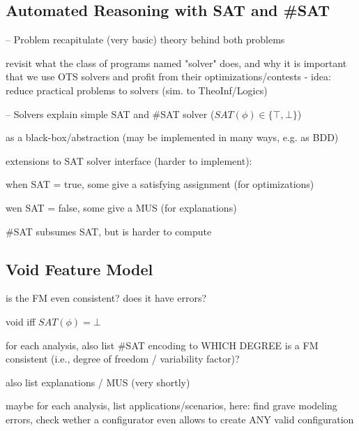 \subsection{Automated Reasoning with SAT and \#SAT}

\begin{frame}{-- Problem}
	recapitulate (very basic) theory behind both problems

	revisit what the class of programs named "solver" does, and why it is important that we use OTS solvers and profit from their optimizations/contests - idea: reduce practical problems to solvers (sim. to TheoInf/Logics)
\end{frame}


\begin{frame}{-- Solvers}
	explain simple SAT and \#SAT solver ($SAT(\phi) \in \{\top, \bot\}$)

	as a black-box/abstraction (may be implemented in many ways, e.g. as BDD)

	extensions to SAT solver interface (harder to implement):
	
	when SAT = true, some give a satisfying assignment (for optimizations)
	
	wen SAT = false, some give a MUS (for explanations) %

	\#SAT subsumes SAT, but is harder to compute
\end{frame}

\subsection{Void Feature Model}
\begin{frame}{\myframetitle}
	is the FM even consistent? does it have errors? %

	void iff $SAT(\phi) = \bot$

	for each analysis, also list \#SAT encoding
	to WHICH DEGREE is a FM consistent (i.e., degree of freedom / variability factor)?

	also list explanations / MUS (very shortly)

	maybe for each analysis, list applications/scenarios, here: find grave modeling errors, check wether a configurator even allows to create ANY valid configuration
\end{frame}

